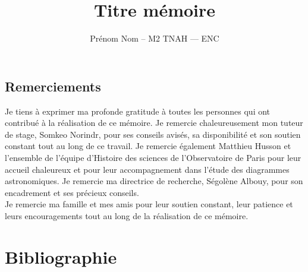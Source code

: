 \documentclass[a4paper,12pt,twoside]{book}
\author{Prénom Nom – M2 TNAH — ENC}
\title{Titre mémoire}
\newcommand\chapterNo[1]{
	\chapter*{#1}
	\markright{\MakeUppercase{#1}}
}
\begin{document}
	
	\onehalfspacing 
	
	\frontmatter
	
	
	
	\thispagestyle{empty}	
	\cleardoublepage
	
	
	
	\chapterNo{Remerciements}
	Je tiens à exprimer ma profonde gratitude à toutes les personnes qui ont contribué à la réalisation de ce mémoire.
	Je remercie chaleureusement mon tuteur de stage, Somkeo Norindr, pour ses conseils avisés, sa disponibilité et son soutien constant tout au long de ce travail. Je remercie également Matthieu Husson et l'ensemble de l'équipe d'Histoire des sciences de l'Observatoire de Paris pour leur accueil chaleureux et pour leur accompagnement dans l'étude des diagrammes astronomiques. Je remercie ma directrice de recherche, Ségolène Albouy, pour son encadrement et ses précieux conseils.\\
	
	Je remercie ma famille et mes amis pour leur soutien constant, leur patience et leurs encouragements tout au long de la réalisation de ce mémoire.  
	
	
	
	
	\part*{Bibliographie}
	
	\printbibliography[keyword={HS},title={Histoire des sciences}]
	\printbibliography[keyword={CV},title={Intelligence artificielle}]
	\printbibliography[keyword={VZ},title={Visualisation}]
	\printbibliography[keyword={DW},title={Développement web}]
	\printbibliography[keyword={DT},title={Documentation technique}]
	
\end{document}

